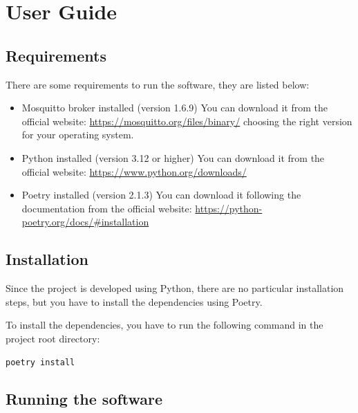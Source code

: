 \documentclass{scrartcl}
\begin{document}
\newpage
\section{User Guide}\label{user-guide}
\subsection{Requirements}\label{user-guide-requirements}
There are some requirements to run the software, they are listed below:
\begin{itemize}
      \item Mosquitto broker installed (version 1.6.9)
            You can download it from the official website: \url{https://mosquitto.org/files/binary/} 
            choosing the right version for your operating system.
      \item Python installed (version 3.12 or higher)
            You can download it from the official website: \url{https://www.python.org/downloads/}
      \item Poetry installed (version 2.1.3)
            You can download it following the documentation from the official website: 
            \url{https://python-poetry.org/docs/#installation}
\end{itemize}

\subsection{Installation}\label{installation}
Since the project is developed using Python, there are no particular installation steps, but you 
have to install the dependencies using Poetry.

To install the dependencies, you have to run the following command in the project root directory:
\begin{verbatim}
poetry install
\end{verbatim}

\subsection{Running the software}\label{running-the-software}

\end{document}
